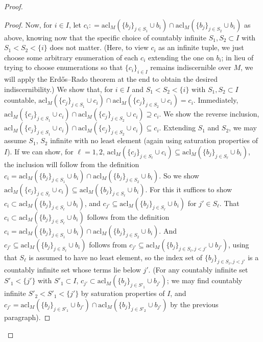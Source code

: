 \documentclass{amsart}
\theoremstyle{definition}
\theoremstyle{remark}
\numberwithin{equation}{section}
\begin{document}
\begin{proof}
\begin{proof}
Now, for $i \in I$, let $c_{i} : = \mathrm{acl}_{M}(\{b_j\}_{j \in S_{1}}\cup b_{i}) \cap \mathrm{acl}_{M}(\{b_j\}_{j \in S_{2}}\cup b_{i})$ as above, knowing now that the specific choice of countably infinite $S_{1}, S_{2} \subset I$ with $S_{1} < S_{2} < \{i\}$ does not matter.  (Here, to view $c_{i}$ as an infinite tuple, we just choose some arbitrary enumeration of each $c_{i}$ extending the one on $b_{i}$; in lieu of trying to choose enumerations so that $\{c_{i}\}_{i \in I}$ remains indiscernible over $M$, we will apply the Erdős–Rado theorem at the end to obtain the desired indiscernibility.) We show that, for $i \in I$ and $S_{1} < S_{2} < \{i\}$ with $S_{1}, S_{2} \subset I$ countable, $\mathrm{acl}_{M}(\{c_j\}_{j \in S_{1}}\cup c_{i}) \cap \mathrm{acl}_{M}(\{c_j\}_{j \in S_{2}}\cup c_{i}) = c_{i}$. Immediately, $\mathrm{acl}_{M}(\{c_j\}_{j \in S_{1}}\cup c_{i}) \cap \mathrm{acl}_{M}(\{c_j\}_{j \in S_{2}}\cup c_{i}) \supseteq c_{i}$. We show the reverse inclusion, $\mathrm{acl}_{M}(\{c_j\}_{j \in S_{1}}\cup c_{i}) \cap \mathrm{acl}_{M}(\{c_j\}_{j \in S_{2}}\cup c_{i}) \subseteq c_{i}$. Extending $S_{1}$ and $S_{2}$, we may assume $S_{1}$, $S_{2}$ infinite with no least element (again using saturation properties of $I$). If we can show, for $\ell = 1, 2$, $\mathrm{acl}_{M}(\{c_j\}_{j \in S_{\ell}}\cup
c_{i}) \subseteq \mathrm{acl}_{M}(\{b_j\}_{j \in S_{\ell}}\cup b_{i})$,  the inclusion will follow from the definition $c_{i}  = \mathrm{acl}_{M}(\{b_j\}_{j \in S_{1}}\cup b_{i}) \cap \mathrm{acl}_{M}(\{b_j\}_{j \in S_{2}}\cup b_{i})$. So we show $\mathrm{acl}_{M}(\{c_j\}_{j \in S_{\ell}}\cup
c_{i}) \subseteq \mathrm{acl}_{M}(\{b_j\}_{j \in S_{\ell}}\cup b_{i})$. For this it suffices to show $c_{i} \subset \mathrm{acl}_{M}(\{b_j\}_{j \in S_{\ell}}\cup b_{i})$, and $c_{j'} \subseteq \mathrm{acl}_{M}(\{b_j\}_{j \in S_{\ell}}\cup b_{i})$ for $j' \in S_{\ell}$. That  $c_{i} \subset \mathrm{acl}_{M}(\{b_j\}_{j \in S_{\ell}}\cup b_{i})$ follows from the definition  $c_{i}  = \mathrm{acl}_{M}(\{b_j\}_{j \in S_{1}}\cup b_{i}) \cap \mathrm{acl}_{M}(\{b_j\}_{j \in S_{2}}\cup b_{i})$. And $c_{j'} \subseteq \mathrm{acl}_{M}(\{b_j\}_{j \in S_{\ell}}\cup b_{i})$ follows from $c_{j'} \subseteq \mathrm{acl}_{M}(\{b_j\}_{j \in S_{\ell}, j < j' }\cup b_{j'})$, using that $S_{\ell}$ is assumed to have no least element, so the index set of $\{b_{j}\}_{j \in S_{\ell}, j < j' }$ is a countably infinite set whose terms lie below $j'$. (For any countably infinite set $S'_{1} < \{j'\}$ with $S'_{1} \subset I$, $c_{j'} \subset \mathrm{acl}_{M}(\{b_j\}_{j \in S'_{1}}\cup b_{j'})$; we may find countably infinite $S'_{2} < S'_{1} < \{j'\}$ by saturation properties of $I$, and $c_{j'}  = \mathrm{acl}_{M}(\{b_j\}_{j \in S'_{1}}\cup b_{j'}) \cap \mathrm{acl}_{M}(\{b_j\}_{j \in S'_{2}}\cup b_{j'})$ by the previous paragraph).


\end{proof}
\end{proof}
\end{document}
